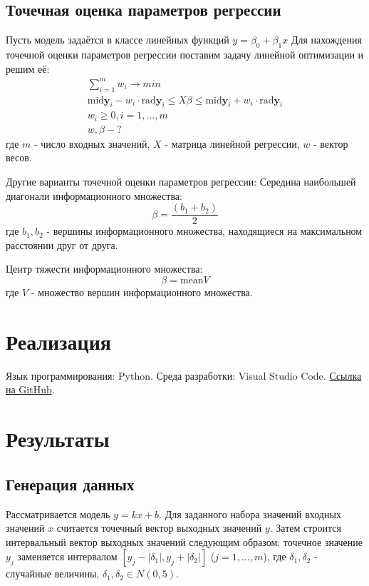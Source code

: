 \documentclass[a4paper,12pt]{article}
\begin{document}
    \subsection{Точечная оценка параметров регрессии}
    Пусть модель задаётся в классе линейных функций $ y = \beta_{0} + \beta_{1}x $
    Для нахождения точечной оценки параметров регрессии поставим задачу линейной оптимизации и решим её:
    \begin{gather}
        \sum_{i = 1}^{m}w_{i} \to min \\
        \text{mid}\textbf{y}_{i} - w_{i} \cdot \text{rad}\textbf{y}_{i} \leq X\beta \leq \text{mid}\textbf{y}_{i} + w_{i} \cdot \text{rad}\textbf{y}_{i} \\
        w_{i} \geq 0, i = 1, ..., m \\
        w, \beta - ?
    \end{gather}
    где $ m $ - число входных значений, $ X $ - матрица линейной регрессии, $ w $ - вектор весов. \newline

    \noindent
    Другие варианты точечной оценки параметров регрессии: \newline
    Середина наибольшей диагонали информационного множества:
    \begin{equation}
        \beta = \frac{(b_{1} + b_{2})}{2}
    \end{equation}
    где $ b_{1}, b_{2} $ - вершины информационного множества, находящиеся на максимальном расстоянии друг от друга.\newline

    \noindent
    Центр тяжести информационного множества:
    \begin{equation}
        \beta = \text{mean}V
    \end{equation}
    где $ V $ - множество вершин информационного множества.
    
    \section{Реализация}
    Язык программирования: Python. Среда разработки: Visual Studio Code.
    \href{https://github.com/kirillkuks/IntervalAnalysis/tree/master/Lab5}{Ссылка на GitHub}.

    \section{Результаты}
    \subsection{Генерация данных}
    Рассматривается модель $ y = kx + b $. Для заданного набора значений входных значений $ x $ считается точечный вектор выходных значений $ y $.
    Затем строится интервальный вектор выходных значений следующим образом: точечное значение $ y_{j} $ заменяется интервалом $ [y_{j} - |\delta_{1}|, y_{j} + |\delta_{2}|] $ ($ j = 1, ..., m $),
    где $ \delta_{1}, \delta_{2} $ - случайные величины, $ \delta_{1}, \delta_{2} \in N(0, 5) $.
    
\end{document}
